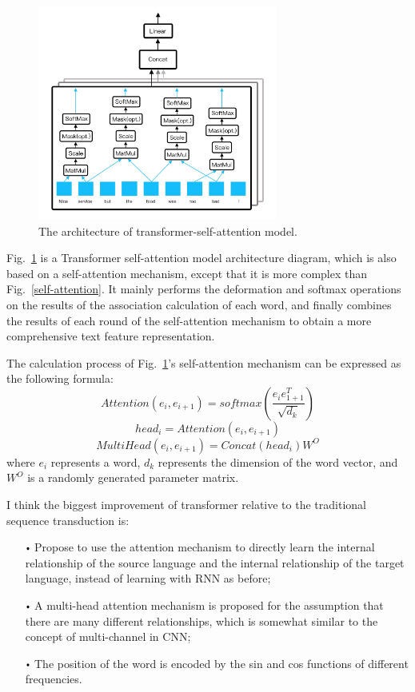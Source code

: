 \documentclass[runningheads, twocolumn]{llncs}
\begin{document}
\begin{figure}[htb]
	\includegraphics[width=0.7\textwidth]{transformer.jpg}
	\centering
	\caption{The architecture of transformer-self-attention model.}\label{transfromer}
\end{figure}

Fig.~\ref{transfromer} is a Transformer self-attention model architecture diagram, which is also based on a self-attention mechanism, except that it is more complex than Fig.~\ref{self-attention}. It mainly performs the deformation and softmax operations on the results of the association calculation of each word, and finally combines the results of each round of the self-attention mechanism to obtain a more comprehensive text feature representation.

The calculation process of Fig.~\ref{transfromer}'s self-attention mechanism can be expressed as the following formula:
\begin{equation}
Attention(e_i, e_{i+1})=softmax(\dfrac{e_i e_{1+1}^T}{\sqrt{d_k}})
\end{equation}
\begin{equation}
head_i=Attention(e_i, e_{i+1})
\end{equation}
\begin{equation}
MultiHead(e_i, e_{i+1})=Concat(head_i)W^O
\end{equation}
where $e_i$ represents a word, $d_k$ represents the dimension of the word vector, and $W^O$ is a randomly generated parameter matrix.

I think the biggest improvement of transformer relative to the traditional sequence transduction is:

\begin{itemize}
	\item[$\vcenter{\hbox{\tiny$\bullet$}}$] Propose to use the attention mechanism to directly learn the internal relationship of the source language and the internal relationship of the target language, instead of learning with RNN as before;
	\item[$\vcenter{\hbox{\tiny$\bullet$}}$] A multi-head attention mechanism is proposed for the assumption that there are many different relationships, which is somewhat similar to the concept of multi-channel in CNN;
	\item[$\vcenter{\hbox{\tiny$\bullet$}}$] The position of the word is encoded by the sin and cos functions of different frequencies.
\end{itemize}
\end{document}
